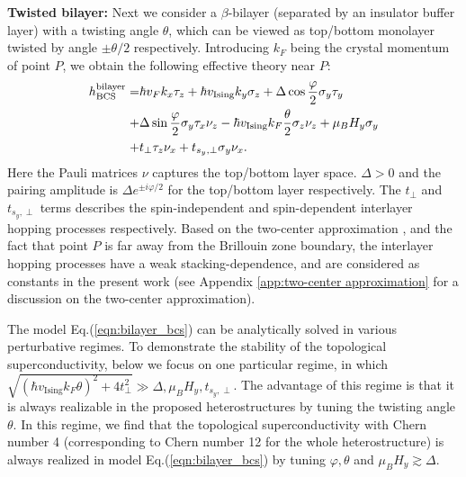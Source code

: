 \vspace{1em}\par
\textbf{Twisted bilayer:} Next we consider a $\beta$-bilayer (separated by an insulator buffer layer) with a twisting angle $\theta$, which can be viewed as top/bottom monolayer twisted by angle $\pm\theta/2$ respectively. Introducing $k_F$ being the crystal momentum of point $P$, we obtain the following effective theory near $P$:
\begin{align}
    h^{\text{bilayer}}_{\text{BCS}}=&\hbar v_F k_x\tau_z+\hbar v_{\text{Ising}} k_y\sigma_z+\Delta\cos\frac{\varphi}{2}\sigma_y\tau_y\notag\\
    +&\Delta\sin\frac{\varphi}{2} \sigma_y\tau_x\nu_z-\hbar v_{\text{Ising}}k_F\frac{\theta}{2}\sigma_z\nu_z+\mu_B H_y\sigma_y\notag\\
    +&t_\perp \tau_z\nu_x+t_{s_y,\perp}\sigma_y\nu_x.\label{eqn:bilayer_bcs}
\end{align}
Here the Pauli matrices $\nu$ captures the top/bottom layer space. $\Delta>0$ and the pairing amplitude is $\Delta e^{\pm i\varphi/2}$ for the top/bottom layer respectively. The $t_\perp$ and $t_{s_y,\perp}$ terms describes the spin-independent and spin-dependent interlayer hopping processes respectively. Based on the two-center approximation \cite{bistritzer2011moire,devakul2021magic}, and the fact that point $P$ is far away from the Brillouin zone boundary, the interlayer hopping processes have a weak stacking-dependence, and are considered as constants in the present work \cite{volkov2020magic,volkov2021josephson} (see Appendix \ref{app:two-center approximation} for a discussion on the two-center approximation).


The model Eq.(\ref{eqn:bilayer_bcs}) can be analytically solved in various perturbative regimes. To demonstrate the stability of the topological superconductivity, below we focus on one particular regime, in which $\sqrt{(\hbar v_{\text{Ising}} k_F\theta)^2+4t_\perp^2}\gg \Delta,\mu_B H_y, t_{s_y,\perp}$. The advantage of this regime is that it is always realizable in the proposed heterostructures by tuning the twisting angle $\theta$. In this regime, we find that the topological superconductivity with Chern number 4 (corresponding to Chern number 12 for the whole heterostructure) is always realized in model Eq.(\ref{eqn:bilayer_bcs}) by tuning $\varphi,\theta$ and $\mu_B H_y \gtrsim  \Delta$.

